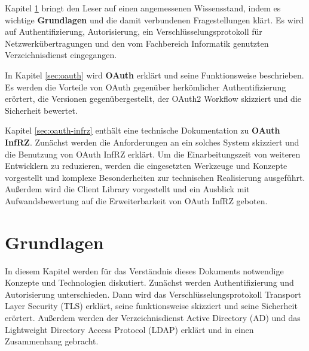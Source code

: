 \documentclass[12pt,a4paper,pointednumbers,abstracton]{scrartcl}
\begin{document}
Kapitel \ref{sec:basics} bringt den Leser auf einen angemessenen Wissensstand, indem es wichtige \textbf{Grundlagen} und die damit verbundenen Fragestellungen klärt.
Es wird auf Authentifizierung, Autorisierung, ein Verschlüsselungsprotokoll für Netzwerkübertragungen und den vom Fachbereich Informatik genutzten Verzeichnisdienst eingegangen.

In Kapitel \ref{sec:oauth} wird \textbf{OAuth} erklärt und seine Funktionsweise beschrieben.
Es werden die Vorteile von OAuth gegenüber herkömlicher Authentifizierung erörtert, die Versionen gegenübergestellt, der OAuth2 Workflow skizziert und die Sicherheit bewertet.

Kapitel \ref{sec:oauth-infrz} enthält eine technische Dokumentation zu \textbf{OAuth InfRZ}.
Zunächst werden die Anforderungen an ein solches System skizziert und die Benutzung von OAuth InfRZ erklärt.
Um die Einarbeitungszeit von weiteren Entwicklern zu reduzieren, werden die eingesetzten Werkzeuge und Konzepte vorgestellt und komplexe Besonderheiten zur technischen Realisierung ausgeführt.
Außerdem wird die Client Library vorgestellt und ein Ausblick mit Aufwandsbewertung auf die Erweiterbarkeit von OAuth InfRZ geboten.


\newpage
\section{Grundlagen}
\label{sec:basics}

In diesem Kapitel werden für das Verständnis dieses Dokuments notwendige Konzepte und Technologien diskutiert.
Zunächst werden Authentifizierung und Autorisierung unterschieden.
Dann wird das Verschlüsselungsprotokoll Transport Layer Security (TLS) erklärt, seine funktionsweise skizziert und seine Sicherheit erörtert.
Außerdem werden der Verzeichnisdienst Active Directory (AD) und das Lightweight Directory Access Protocol (LDAP) erklärt und in einen Zusammenhang gebracht.

\end{document}
